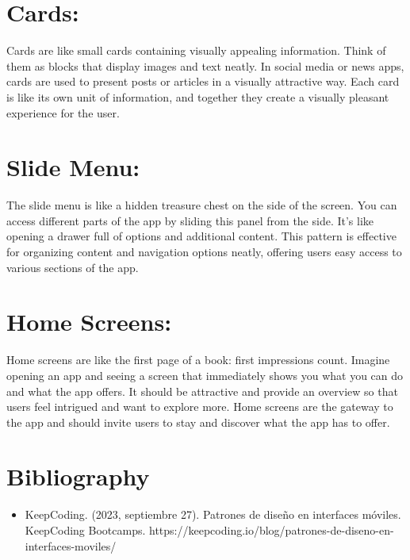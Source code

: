 \documentclass{article}
\begin{document}
\section*{Cards:}

Cards are like small cards containing visually appealing information. Think of them as blocks that display images and text neatly. In social media or news apps, cards are used to present posts or articles in a visually attractive way. Each card is like its own unit of information, and together they create a visually pleasant experience for the user.

\section*{Slide Menu:}

The slide menu is like a hidden treasure chest on the side of the screen. You can access different parts of the app by sliding this panel from the side. It's like opening a drawer full of options and additional content. This pattern is effective for organizing content and navigation options neatly, offering users easy access to various sections of the app.

\section*{Home Screens:}

Home screens are like the first page of a book: first impressions count. Imagine opening an app and seeing a screen that immediately shows you what you can do and what the app offers. It should be attractive and provide an overview so that users feel intrigued and want to explore more. Home screens are the gateway to the app and should invite users to stay and discover what the app has to offer.


\section{Bibliography}
\begin{itemize}
\item KeepCoding. (2023, septiembre 27). Patrones de diseño en interfaces móviles. KeepCoding Bootcamps. https://keepcoding.io/blog/patrones-de-diseno-en-interfaces-moviles/
\end{itemize}
\end{document}
